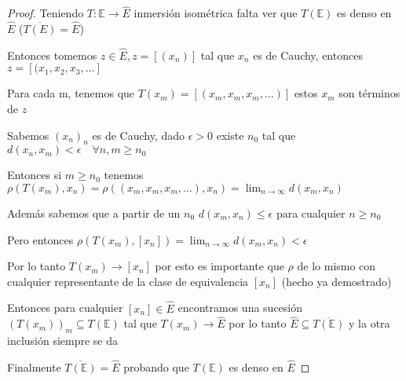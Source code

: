 \documentclass[12pt]{article}
\newcommand{\E}{\mathbb{E}}
\newcommand{\ra}{\rightarrow}
\newcommand{\ol}{\overline}
\theoremstyle{definition}
\begin{document}
\begin{proof}
Teniendo $T: \E \ra \hat{E}$ inmersión isométrica falta ver que $T(\E)$ es denso en $\hat{E}$ ($\ol{T(E)} = \hat{E}$)

Entonces tomemos $z \in \hat{E}, z = [(x_n) ]$ tal que $x_n$ es de Cauchy, entonces $z = [(x_1,x_2,x_3, \dots ]$

  Para cada m, tenemos que $T(x_m) = [(x_m,x_m,x_m,\dots) ]$ estos $x_m$ son términos de $z$ 

  Sabemos $(x_n)_n$ es de Cauchy, dado $\epsilon > 0$ existe $n_0$ tal que $d(x_n,x_m) < \epsilon \quad \forall n,m \geq n_0$

  Entonces si $m \geq n_0$ tenemos $\rho(T(x_m),x_n) = \rho ((x_m,x_m,x_m, \dots),x_n) = \lim_{n \ra \infty} d(x_m,x_n) $ 
  
  Además sabemos que a partir de un $n_0$ $d(x_m,x_n) \leq \epsilon$ para cualquier $n \geq n_0$

  Pero entonces $\rho(T(x_m),[x_n]) = \lim_{n \ra \infty} d(x_m,x_n) < \epsilon$

  Por lo tanto $T(x_m) \ra [x_n]$ por esto es importante que $\rho$ de lo mismo con cualquier representante de la clase de equivalencia $[x_n]$ (hecho ya demostrado)

  Entonces para cualquier $[x_n ] \in \hat{E}$ encontramos una sucesión $(T(x_m))_m \subseteq T(\E)$ tal que $T(x_m) \ra \hat{E}$ por lo tanto $\hat{E} \subseteq \ol{T(\E)}$ y la otra inclusión siempre se da

  Finalmente $\ol{T(\E)} = \hat{E}$ probando que $T(\E)$ es denso en $\hat{E}$
\end{proof}
\end{document}
